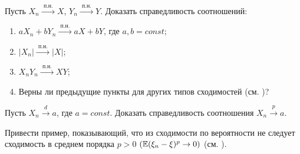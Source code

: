 


\begin{problem}
Пусть $X_n \overset{\text{ п.н. }}{\longrightarrow} X$, $Y_n \overset{\text{ п.н. }}{\longrightarrow} Y$. Доказать справедливость соотношений:
\begin{enumerate}
\item $a X_n + b Y_n \overset{\text{ п.н. }}{\longrightarrow} a X + b Y$, где  $a, b = const$;
\item $|X_n| \overset{\text{ п.н. }}{\longrightarrow} |X|$;
\item $X_n Y_n \overset{\text{ п.н. }}{\longrightarrow} XY$;
\item Верны ли предыдущие пункты для других типов сходимостей (см. \cite{stoianov})? 
\end{enumerate}

\end{problem}

\begin{problem}
Пусть $X_n \overset{d}{\longrightarrow} a$, где $a = const$. Доказать справедливость соотношения $X_n \overset{p}{\longrightarrow} a$.
\end{problem}

\begin{problem}
Привести пример, показывающий, что из сходимости по вероятности не следует сходимость в среднем порядка $p > 0$ $(\mathrm{{\mathbb E}} (\xi_n - \xi)^p \to 0)$ (см. \cite{stoianov}).
\end{problem}



